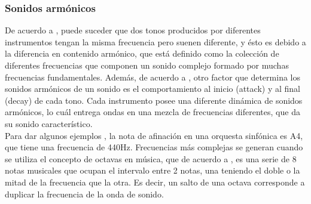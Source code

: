 \documentclass[12pt, letterpaper]{article}
\begin{document}
\subsubsection{Sonidos armónicos}

De acuerdo a \cite{university-physics}, puede suceder que dos tonos producidos por diferentes instrumentos tengan la 
misma frecuencia pero suenen diferente, y ésto es debido a la diferencia en contenido armónico, que está definido como la colección de diferentes frecuencias 
que componen un sonido complejo formado por muchas frecuencias fundamentales. Además, de acuerdo a \cite{university-physics}, otro factor que determina los 
sonidos armónicos de un sonido es el comportamiento al inicio (attack) y al final (decay) de cada tono. Cada instrumento posee una diferente dinámica de sonidos armónicos, 
lo cuál entrega ondas en una mezcla de frecuencias diferentes, que da su sonido característico. \\

Para dar algunos ejemplos \cite{orchestra-frecuency}, la nota de afinación en una orquesta sinfónica es A4, que tiene una frecuencia de 440Hz. Frecuencias más complejas se generan cuando 
se utiliza el concepto de octavas en música, que de acuerdo a \cite{octave-definition}, es una serie de 8 notas musicales que ocupan el intervalo entre 2 notas, una teniendo el doble 
o la mitad de la frecuencia que la otra. Es decir, un salto de una octava corresponde a duplicar la frecuencia de la onda de sonido. 
\end{document}

